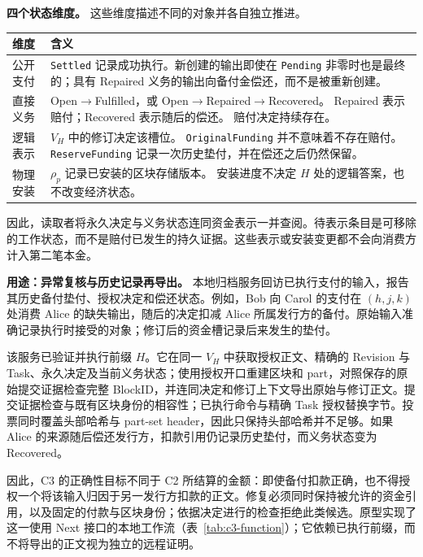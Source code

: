 \noindent\textbf{四个状态维度。}
这些维度描述不同的对象并各自独立推进。

\par\smallskip
{\small
\setlength{\tabcolsep}{3pt}
\noindent
\begin{tabular}{@{}p{}p{}@{}}
\toprule
维度 & 含义 \\
\midrule
公开支付 &
\texttt{Settled} 记录成功执行。新创建的输出即使在 \texttt{Pending} 非零时也是最终的；具有 Repaired 义务的输出向备付金偿还，而不是被重新创建。 \\

直接义务 &
Open$\to$Fulfilled，或 Open$\to$Repaired$\to$Recovered。
Repaired 表示赔付；Recovered 表示随后的偿还。
赔付决定持续存在。 \\

逻辑表示 &
$V_H$ 中的修订决定该槽位。
\texttt{OriginalFunding} 并不意味着不存在赔付。
\texttt{ReserveFunding} 记录一次历史垫付，并在偿还之后仍然保留。 \\

物理安装 &
$\rho_p$ 记录已安装的区块存储版本。
安装进度不决定 $H$ 处的逻辑答案，也不改变经济状态。 \\
\bottomrule
\end{tabular}
\par}

因此，读取者将永久决定与义务状态连同资金表示一并查阅。待表示条目是可移除的工作状态，而不是赔付已发生的持久证据。这些表示或安装变更都不会向消费方计入第二笔本金。

\noindent\textbf{用途：异常复核与历史记录再导出。}
本地归档服务回访已执行支付的输入，报告其历史备付垫付、授权决定和偿还状态。例如，Bob 向 Carol 的支付在 $(h,j,k)$ 处消费 Alice 的缺失输出，随后的决定扣减 Alice 所属发行方的备付。原始输入准确记录执行时接受的对象；修订后的资金槽记录后来发生的垫付。

该服务已验证并执行前缀 $H$。它在同一 $V_H$ 中获取授权正文、精确的 Revision 与 Task、永久决定及当前义务状态；使用授权开口重建区块和 part，对照保存的原始提交证据检查完整 BlockID，并连同决定和修订上下文导出原始与修订正文。提交证据检查与既有区块身份的相容性；已执行命令与精确 Task 授权替换字节。投票同时覆盖头部哈希与 part-set header，因此只保持头部哈希并不足够。如果 Alice 的来源随后偿还发行方，扣款引用仍记录历史垫付，而义务状态变为 Recovered。

因此，C3 的正确性目标不同于 C2 所结算的金额：即使备付扣款正确，也不得授权一个将该输入归因于另一发行方扣款的正文。修复必须同时保持被允许的资金引用，以及固定的付款与区块身份；依据决定进行的检查拒绝此类候选。原型实现了这一使用 Next 接口的本地工作流（表~\ref{tab:c3-function}）；它依赖已执行前缀，而不将导出的正文视为独立的远程证明。

